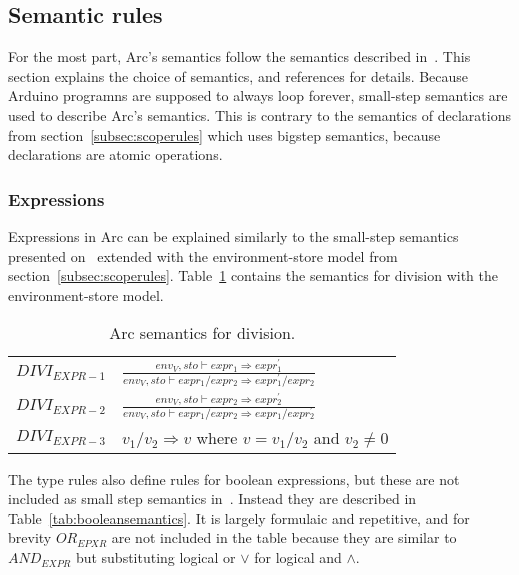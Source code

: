 \subsection{Semantic rules}\label{subsec:semanticrules}
For the most part, Arc's semantics follow the semantics described in~\cite{Huttel2010}. This section explains the choice of semantics, and references \cite{Huttel2010} for details. Because Arduino programns are supposed to always loop forever, small-step semantics are used to describe Arc's semantics. This is contrary to the semantics of declarations from section~\ref{subsec:scoperules} which uses bigstep semantics, because declarations are atomic operations.

\subsubsection{Expressions}
Expressions in Arc can be explained similarly to the small-step semantics presented on~\cite[p.~37]{Huttel2010} extended with the environment-store model from section~\ref{subsec:scoperules}. Table~\ref{tab:divisionsemantics} contains the semantics for division with the environment-store model.


\begin{table}[htb!]
    \centering
    \begin{tabular}{ll}
        \toprule
        $DIVI_{EXPR-1}$ & $\frac{env_V, sto \vdash expr_1 \Rightarrow expr^\prime_1}{env_V, sto \vdash expr_1 / expr_2 \Rightarrow expr^\prime_1 / expr_2}$ \\ [12pt]
        $DIVI_{EXPR-2}$ & $\frac{env_V, sto \vdash expr_2 \Rightarrow expr^\prime_2}{env_V, sto \vdash expr_1 / expr_2 \Rightarrow expr_1 / expr^\prime_2}$ \\ [12pt]
        $DIVI_{EXPR-3}$ & $v_1 / v_2 \Rightarrow v$ where $v =v_1 / v_2$ and $v_2 \neq 0$                                                                   \\
        \bottomrule
    \end{tabular}
    \caption{Arc semantics for division.}
    \label{tab:divisionsemantics}
\end{table}


The type rules also define rules for boolean expressions, but these are not included as small step semantics in~\cite{Huttel2010}. Instead they are described in Table~\ref{tab:booleansemantics}. It is largely formulaic and repetitive, and for brevity $OR_{EPXR}$ are not included in the table because they are similar to $AND_{EXPR}$ but substituting logical or $\lor$ for logical and $\land$.


